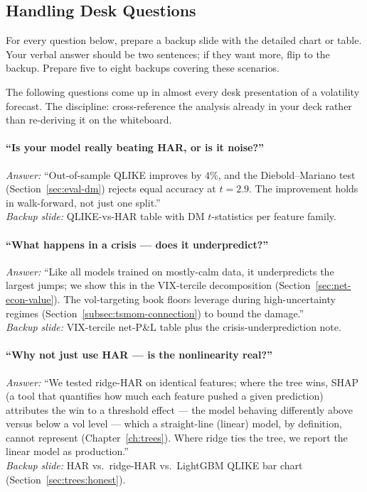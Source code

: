 \subsection{Handling Desk Questions}
\label{subsec:desk-qa}

\begin{prereq}
For every question below, prepare a backup slide with the detailed chart or table. Your verbal answer should be two sentences; if they want more, flip to the backup. Prepare five to eight backups covering these scenarios.
\end{prereq}

The following questions come up in almost every desk presentation of a volatility forecast. The discipline: cross-reference the analysis already in your deck rather than re-deriving it on the whiteboard.

\paragraph{``Is your model really beating HAR, or is it noise?''}
\emph{Answer:} ``Out-of-sample QLIKE improves by $4\%$, and the Diebold--Mariano test (Section~\ref{sec:eval-dm}) rejects equal accuracy at $t = 2.9$. The improvement holds in walk-forward, not just one split.''\\
\noindent\emph{Backup slide:} QLIKE-vs-HAR table with DM $t$-statistics per feature family.

\paragraph{``What happens in a crisis --- does it underpredict?''}
\emph{Answer:} ``Like all models trained on mostly-calm data, it underpredicts the largest jumps; we show this in the VIX-tercile decomposition (Section~\ref{sec:net-econ-value}). The vol-targeting book floors leverage during high-uncertainty regimes (Section~\ref{subsec:tsmom-connection}) to bound the damage.''\\
\noindent\emph{Backup slide:} VIX-tercile net-P\&L table plus the crisis-underprediction note.

\paragraph{``Why not just use HAR --- is the nonlinearity real?''}
\emph{Answer:} ``We tested ridge-HAR on identical features; where the tree wins, SHAP (a tool that quantifies how much each feature pushed a given prediction) attributes the win to a threshold effect --- the model behaving differently above versus below a vol level --- which a straight-line (linear) model, by definition, cannot represent (Chapter~\ref{ch:trees}). Where ridge ties the tree, we report the linear model as production.''\\
\noindent\emph{Backup slide:} HAR vs.\ ridge-HAR vs.\ LightGBM QLIKE bar chart (Section~\ref{sec:trees:honest}).


